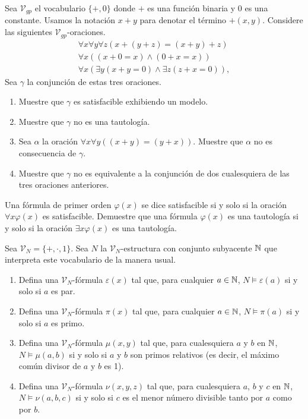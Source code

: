 \documentclass[12pt,a4paper]{book}
\newcommand{\VV}{\mathcal{V}}
\begin{document}
    \begin{ejercicio}
        Sea $\VV_{gp}$ el vocabulario $\{+,0\}$ donde $+$ es una función binaria y $0$ es una constante. Usamos la
        notación $x+y$ para denotar el término $+(x,y)$. Considere las siguientes $\VV_{gp}$-oraciones.
        \begin{gather*}
            \forall x\forall y\forall z(x+(y+z)=(x+y)+z)\\
            \forall x((x+0=x)\wedge(0+x=x))\\
            \forall x(\exists y(x+y=0)\wedge\exists z(z+x=0)),
        \end{gather*}
        Sea $\gamma$ la conjunción de estas tres oraciones.
        \begin{enumerate}[label=(\alph*)]
            \item Muestre que $\gamma$ es satisfacible exhibiendo un modelo.
            \item Muestre que $\gamma$ no es una tautología.
            \item Sea $\alpha$ la oración $\forall x\forall y((x+y)=(y+x))$. Muestre que $\alpha$ no es consecuencia de
            $\gamma$.
            \item Muestre que $\gamma$ no es equivalente a la conjunción de dos cualesquiera de las tres oraciones
            anteriores.
        \end{enumerate}
    \end{ejercicio}

    \begin{ejercicio}\label{ej:satisfacible-formula-abierta}
        Una fórmula de primer orden $\varphi(x)$ se dice satisfacible si y solo si la oración $\forall x\varphi(x)$ es
        satisfacible. Demuestre que una fórmula $\varphi(x)$ es una tautología si y solo si la oración $\exists x\varphi(x)$
        es una tautología.
    \end{ejercicio}

    \begin{ejercicio}
        Sea $\VV_{N}=\{+,\cdot,1\}$. Sea $N$ la $\VV_{N}$-estructura con conjunto subyacente $\mathbb{N}$ que interpreta este
        vocabulario de la manera usual.
        \begin{enumerate}[label=(\alph*)]
            \item Defina una $\VV_{N}$-fórmula $\varepsilon(x)$ tal que, para cualquier $a\in\mathbb{N}$, $N\models\varepsilon(a)$
            si y solo si $a$ es par.
            \item Defina una $\VV_{N}$-fórmula $\pi(x)$ tal que, para cualquier $a\in\mathbb{N}$, $N\models\pi(a)$ si y solo si $a$
            es primo.
            \item Defina una $\VV_{N}$-fórmula $\mu(x,y)$ tal que, para cualesquiera $a$ y $b$ en $\mathbb{N}$, $N\models\mu(a,b)$
            si y solo si $a$ y $b$ son primos relativos (es decir, el máximo común divisor de $a$ y $b$ es 1).
            \item Defina una $\VV_{N}$-fórmula $\nu(x,y,z)$ tal que, para cualesquiera $a$, $b$ y $c$ en $\mathbb{N}$,
            $N\models\nu(a,b,c)$ si y solo si $c$ es el menor número divisible tanto por $a$ como por $b$.
        \end{enumerate}
    \end{ejercicio}
\end{document}
